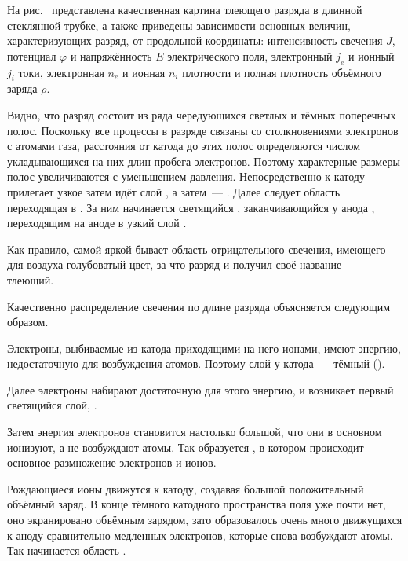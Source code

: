 На рис.~ представлена качественная картина тлеющего
разряда в длинной стеклянной трубке, а также приведены зависимости
основных величин, характеризующих разряд, от продольной координаты:
интенсивность свечения $J$, потенциал $\varphi$ и напряжённость $E$ электрического поля,
электронный $j_e$ и ионный $j_i$ токи,
электронная $n_e$ и ионная $n_i$ плотности и полная плотность объёмного заряда $\rho$.

Видно, что разряд состоит из ряда чередующихся светлых и тёмных поперечных
полос. Поскольку все процессы в разряде
связаны со столкновениями электронов с атомами газа, расстояния от катода до
этих полос определяются числом
укладывающихся на них длин пробега электронов. Поэтому характерные размеры полос
увеличиваются с уменьшением давления.
Непосредственно к катоду прилегает узкое 
затем идёт слой , а
затем~--- . Далее следует область
 переходящая в
. За ним начинается светящийся
, заканчивающийся у анода
, переходящим на аноде в узкий слой
.

Как правило, самой яркой бывает область отрицательного свечения, имеющего для
воздуха голубоватый цвет, за что разряд и
получил своё название~--- тлеющий.

Качественно распределение свечения по длине разряда объясняется следующим
образом.

Электроны, выбиваемые из катода приходящими на него ионами, имеют энергию,
недостаточную для возбуждения атомов. Поэтому слой у катода~--- тёмный
().

Далее электроны набирают достаточную
для этого энергию, и возникает первый светящийся слой,
.

Затем энергия электронов становится настолько
большой, что они в основном ионизуют, а не возбуждают атомы. Так образуется
, в котором происходит
основное размножение электронов и ионов.

Рождающиеся ионы движутся к катоду,
создавая большой положительный объёмный заряд. В конце тёмного
катодного пространства поля уже почти нет, оно экранировано объёмным зарядом,
зато образовалось очень много движущихся к аноду сравнительно медленных
электронов, которые снова возбуждают атомы. Так
начинается область .

